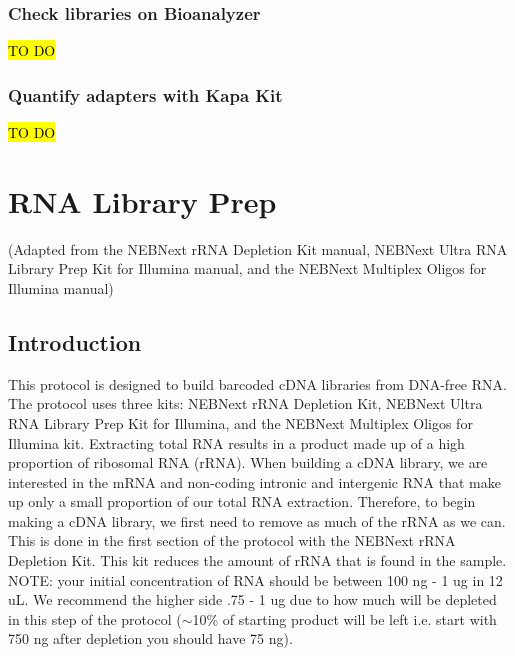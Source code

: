 \documentclass[11pt, oneside]{article}
\begin{document}
\subsubsection{Check libraries on Bioanalyzer}
	\hl{TO DO}

\subsubsection{Quantify adapters with Kapa Kit}
	\hl{TO DO}					

\clearpage
\newpage
\section{RNA Library Prep}

	\noindent (Adapted from the NEBNext rRNA Depletion Kit manual, NEBNext Ultra RNA Library Prep Kit for Illumina manual, and the NEBNext Multiplex Oligos for Illumina manual)
	
	\vspace{3mm}
	
	\subsection{Introduction}
	
	\vspace{2mm}
	
	\noindent This protocol is designed to build barcoded cDNA libraries from DNA-free RNA. The protocol uses three kits: NEBNext rRNA Depletion Kit, 	NEBNext Ultra RNA Library Prep Kit for Illumina, and the NEBNext Multiplex Oligos for Illumina kit. Extracting total RNA results in a product made up of 	a high proportion of ribosomal RNA (rRNA). When building a cDNA library, we are interested in the mRNA and non-coding intronic and intergenic RNA 	that make up only a small proportion of our total RNA extraction. Therefore, to begin making a cDNA library, we first need to remove as much of the 		rRNA as we can. This is done in the first section of the protocol with the NEBNext rRNA Depletion Kit. This kit reduces the amount of rRNA that is found 	in the sample. NOTE: your initial concentration of RNA should be between 100 ng - 1 ug in 12 uL. We recommend the higher side .75 - 1 ug due to how 	much will be depleted in this step of the protocol ($\sim$10\% of starting product will be left i.e. start with 750 ng after depletion you should have 75 ng). 
	
	\vspace{2mm}
	
\end{document}
